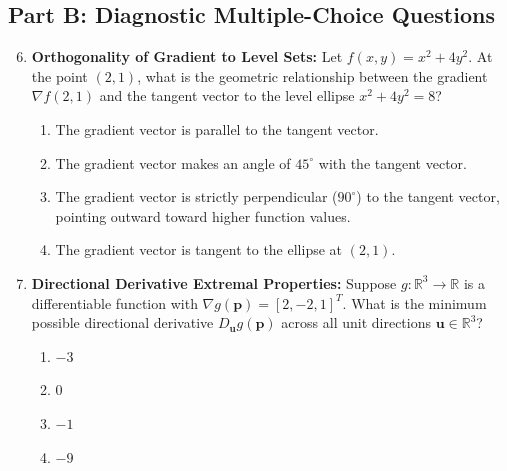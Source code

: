 \subsection*{Part B: Diagnostic Multiple-Choice Questions}
\begin{enumerate}
\setcounter{enumi}{5}
\item \textbf{Orthogonality of Gradient to Level Sets:} Let $f(x, y) = x^2 + 4y^2$. At the point $(2, 1)$, what is the geometric relationship between the gradient $\nabla f(2, 1)$ and the tangent vector to the level ellipse $x^2 + 4y^2 = 8$?
\begin{enumerate}
    \item The gradient vector is parallel to the tangent vector.
    \item The gradient vector makes an angle of $45^\circ$ with the tangent vector.
    \item The gradient vector is strictly perpendicular ($90^\circ$) to the tangent vector, pointing outward toward higher function values.
    \item The gradient vector is tangent to the ellipse at $(2, 1)$.
\end{enumerate}

\item \textbf{Directional Derivative Extremal Properties:} Suppose $g: \mathbb{R}^3 \to \mathbb{R}$ is a differentiable function with $\nabla g(\mathbf{p}) = [2, -2, 1]^T$. What is the minimum possible directional derivative $D_{\mathbf{u}} g(\mathbf{p})$ across all unit directions $\mathbf{u} \in \mathbb{R}^3$?
\begin{enumerate}
    \item $-3$
    \item $0$
    \item $-1$
    \item $-9$
\end{enumerate}
\end{enumerate}
